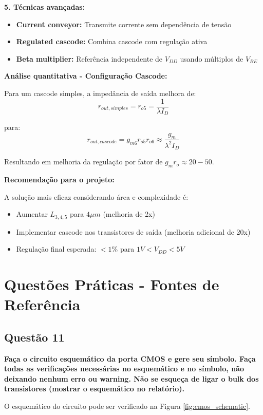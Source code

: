 ﻿\documentclass[12pt,a4paper]{article}
\begin{document}
\textbf{5. Técnicas avançadas:}
\begin{itemize}
    \item \textbf{Current conveyor:} Transmite corrente sem dependência de tensão
    \item \textbf{Regulated cascode:} Combina cascode com regulação ativa
    \item \textbf{Beta multiplier:} Referência independente de $V_{DD}$ usando múltiplos de $V_{BE}$
\end{itemize}

\textbf{Análise quantitativa - Configuração Cascode:}

Para um cascode simples, a impedância de saída melhora de:
$$r_{out,simples} = r_{o5} = \frac{1}{\lambda I_D} $$

para:
$$r_{out,cascode} = g_{m6} r_{o5} r_{o6} \approx \frac{g_m}{\lambda^2 I_D} $$

Resultando em melhoria da regulação por fator de $g_m r_o \approx 20-50$.

\textbf{Recomendação para o projeto:}

A solução mais eficaz considerando área e complexidade é:
\begin{itemize}
    \item Aumentar $L_{3,4,5}$ para $4\mu m$ (melhoria de 2x)
    \item Implementar cascode nos transistores de saída (melhoria adicional de 20x)
    \item Regulação final esperada: $< 1\%$ para $1V < V_{DD} < 5V$
\end{itemize}

\section{Questões Práticas - Fontes de Referência}

\subsection*{Questão 11}

	\textbf{Faça o circuito esquemático da porta CMOS e gere seu símbolo. Faça todas as verificações necessárias no esquemático e no símbolo, não deixando nenhum erro ou warning. Não se esqueça de ligar o bulk dos transistores (mostrar o esquemático no relatório).}

O esquemático do circuito pode ser verificado na Figura \ref{fig:cmos_schematic}.
\end{document}
